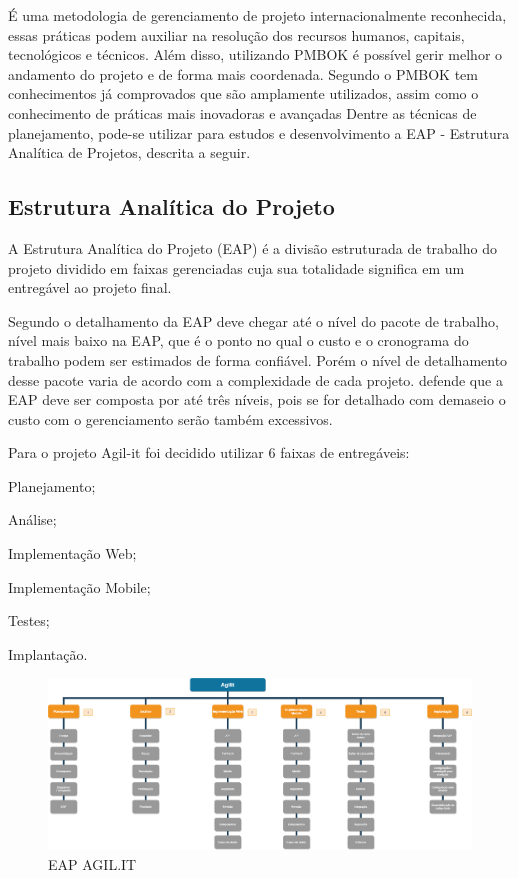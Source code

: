 {É uma metodologia de gerenciamento de projeto internacionalmente reconhecida, essas práticas podem auxiliar na resolução dos recursos humanos, capitais, tecnológicos e técnicos. Além disso, utilizando PMBOK é possível gerir melhor o andamento do projeto e de forma mais coordenada. Segundo \cite{PMG2018} o PMBOK tem conhecimentos já comprovados que são amplamente utilizados, assim como o conhecimento de práticas mais inovadoras e avançadas} Dentre as técnicas de planejamento, pode-se utilizar para estudos e desenvolvimento a EAP -  Estrutura Analítica de Projetos, descrita a seguir.

\subsection{Estrutura Analítica do Projeto}

A Estrutura Analítica do Projeto (EAP) é a divisão estruturada de trabalho do projeto dividido em faixas gerenciadas cuja sua totalidade significa em um entregável ao projeto final.
	
Segundo \cite{PMI2018} o detalhamento da EAP deve chegar até o nível do pacote de trabalho, nível mais baixo na EAP, que é o ponto no qual o custo e o cronograma do trabalho podem ser estimados de forma confiável. Porém o nível de detalhamento desse pacote varia de acordo com a complexidade de cada projeto. \cite{kerzner2017} defende que a EAP deve ser composta por até três níveis, pois se for detalhado com demaseio o custo com o gerenciamento serão também excessivos.

Para o projeto Agil-it foi decidido utilizar 6 faixas de entregáveis:

\begin{subalineas}
	\item {Planejamento};
	\item {Análise};
	\item {Implementação Web};
	\item {Implementação Mobile};
	\item {Testes};
	\item {Implantação}.
\end{subalineas}


\begin{landscape}
	\begin{figure}[htb]
		\caption{\label{EAP}EAP AGIL.IT}
		\begin{center}
			\includegraphics[scale=0.38]{./Figuras/EAP.png}
		\end{center}
	\end{figure}
\end{landscape}


